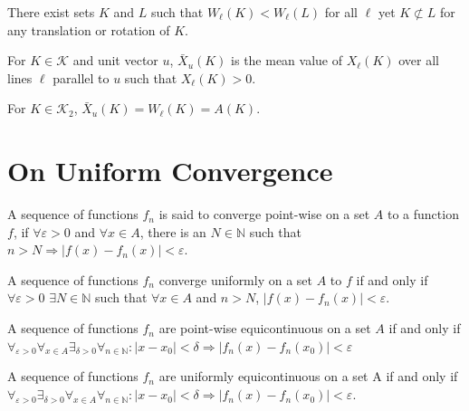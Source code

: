 \documentclass[crop=false,class=book,oneside]{standalone}
\begin{document}
            \begin{theorem}
            There exist sets $K$ and $L$ such that $W_{\ell}(K)<W_{\ell}(L)$ for all $\ell$ yet $K\not\subset L$ for any translation or rotation of $K$.
            \end{theorem}
            \begin{definition}
            For $K\in \mathscr{K}$ and unit vector $u$, $\bar{X}_{u}(K)$ is the mean value of $X_{\ell}(K)$ over all lines $\ell$ parallel to $u$ such that $X_{\ell}(K)>0$.
            \end{definition}
            \begin{theorem}
            For $K\in \mathscr{K}_2$, $\bar{X}_{u}(K) = W_{\ell}(K)=A(K)$.
            \end{theorem}
        \section{On Uniform Convergence}
            \begin{definition}
                A sequence of functions $f_n$ is said to converge
                point-wise on a set $A$ to a function $f$, if
                $\forall\varepsilon>0$ and $\forall x\in A$, there is
                an $N\in\mathbb{N}$ such that $n>N \Rightarrow
                |f(x)-f_n(x)|<\varepsilon$.
            \end{definition}
            \begin{definition}
                A sequence of functions $f_n$ converge uniformly on a
                set $A$ to $f$ if and only if $\forall \varepsilon>0$
                $\exists N\in\mathbb{N}$ such that $\forall x \in A$
                and $n>N$, $|f(x) -f_n(x)|<\varepsilon$.
            \end{definition}
            \begin{definition}
                A sequence of functions $f_n$ are point-wise
                equicontinuous on a set $A$ if and only if
                $\forall_{\varepsilon>0}\forall_{x\in A}
                \exists_{\delta>0}\forall_{n\in\mathbb{N}}:
                |x-x_0|<\delta\Rightarrow|f_{n}(x)-f_{n}(x_0)|<
                \varepsilon$
            \end{definition}
            \begin{definition}
                A sequence of functions $f_n$ are uniformly
                equicontinuous on a set A if and only if
                $\forall_{\varepsilon>0}\exists_{\delta>0}
                \forall_{x\in A}\forall_{n\in\mathbb{N}}:
                |x-x_{0}|<\delta\Rightarrow|f_{n}(x)-f_{n}(x_{0})|<
                \varepsilon$.
            \end{definition}
\end{document}
